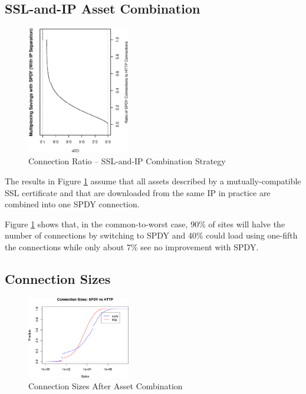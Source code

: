 \documentclass[11pt,letterpaper,notitlepage]{article}
\begin{document}
\subsection{SSL-and-IP Asset Combination}
\begin{figure}[h!]
\centering
\includegraphics[width=0.4\textwidth,angle=270]{plots/asset_combination_ssl_and_ip_ratio.eps}
\caption{Connection Ratio -- SSL-and-IP Combination Strategy}
\label{fig:combination-ssl-and-ip}
\end{figure}
The results in Figure \ref{fig:combination-ssl-and-ip} assume that all assets
described by a mutually-compatible SSL certificate and that are downloaded from
the same IP in practice are combined into one SPDY connection.

Figure \ref{fig:combination-ssl-and-ip} shows that, in the common-to-worst
case, 90\% of sites will halve the number of connections by switching to SPDY
and 40\% could load using one-fifth the connections while only about 7\% see no
improvement with SPDY.

\subsection{Connection Sizes}
\begin{figure}[h!]
\centering
\includegraphics[width=0.4\textwidth]{plots/asset_combination_connection_sizes.eps}
\caption{Connection Sizes After Asset Combination}
\label{fig:connection-sizes}
\end{figure}
\end{document}
